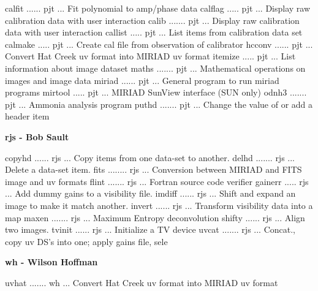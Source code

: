 {\eightpoint\begintt
calfit ...... pjt  ... Fit polynomial to amp/phase data 
calflag ..... pjt  ... Display raw calibration data with user interaction 
calib ....... pjt  ... Display raw calibration data with user interaction 
callist ..... pjt  ... List items from calibration data set 
calmake ..... pjt  ... Create cal file from observation of calibrator 
\endtt}
{\eightpoint\begintt
hcconv ...... pjt  ... Convert Hat Creek uv format into MIRIAD uv format 
itemize ..... pjt  ... List information about image dataset 
maths ....... pjt  ... Mathematical operations on images and image data 
miriad ...... pjt  ... General program to run miriad programs 
mirtool ..... pjt  ... MIRIAD SunView interface (SUN only) 
\endtt}
{\eightpoint\begintt
odnh3 ....... pjt  ... Ammonia analysis program 
puthd ....... pjt  ... Change the value of or add a header item 
\endtt}
\par\centerline {\bf rjs - Bob Sault}
{\eightpoint\begintt
copyhd ...... rjs  ... Copy items from one data-set to another. 
delhd ....... rjs  ... Delete a data-set item. 
fits ........ rjs  ... Conversion between MIRIAD and FITS image and uv formats 
flint ....... rjs  ... Fortran source code verifier 
gainerr ..... rjs  ... Add dummy gains to a visibility file. 
\endtt}
{\eightpoint\begintt
imdiff ...... rjs  ... Shift and expand an image to make it match another. 
invert ...... rjs  ... Transform visibility data into a map 
maxen ....... rjs  ... Maximum Entropy deconvolution 
shifty ...... rjs  ... Align two images. 
tvinit ...... rjs  ... Initialize a TV device 
\endtt}
{\eightpoint\begintt
uvcat ....... rjs  ... Concat., copy uv DS's into one; apply gains file, sele 
\endtt}
\par\centerline {\bf wh - Wilson Hoffman}
{\eightpoint\begintt
uvhat ....... wh   ... Convert Hat Creek uv format into MIRIAD uv format 
\endtt}
